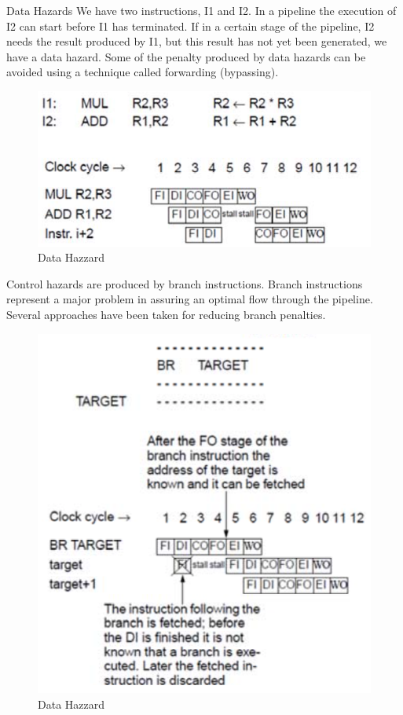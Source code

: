 Data Hazards We have two instructions, I1 and I2. In a pipeline the execution of I2 can start before I1 has terminated. If in a certain stage of the pipeline, I2 needs the result produced by I1, but this result has not yet been generated, we have a data hazard. Some of the penalty produced by data hazards can be avoided using a technique called forwarding (bypassing). \newline

\begin{figure}[H]
\centering
\includegraphics{pic/data_hazard}
\caption{Data Hazzard}
\end{figure}


Control hazards are produced by branch instructions. Branch instructions represent a major problem in assuring an optimal flow through the pipeline. Several approaches have been taken for reducing branch penalties. \newline
\begin{figure}[H]
\centering
\includegraphics{pic/ctrl_hazard}
\caption{Data Hazzard}
\end{figure}


